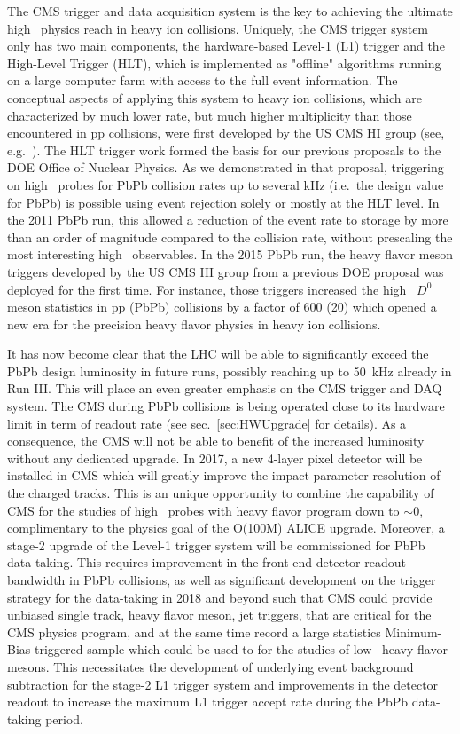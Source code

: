 The CMS trigger and data acquisition system is the key to achieving the ultimate high \pt\ physics reach in heavy ion collisions. Uniquely, the CMS trigger system only has two main components, the hardware-based Level-1 (L1) trigger and the High-Level Trigger (HLT), which is implemented as "offline" algorithms running on a large computer farm with access to the full event information.  
The conceptual aspects of applying this system to heavy ion collisions, which are characterized by much lower rate, but much higher multiplicity than those encountered in pp collisions, were first developed by the US CMS HI group (see, e.g.\ \cite{Roland:2007is}). The HLT trigger work formed the basis for our previous proposals to the DOE Office of Nuclear Physics. As we demonstrated in that proposal, triggering on high \pt\ probes for PbPb collision rates up to several kHz (i.e.\ the design value for PbPb) is possible using event rejection solely or mostly at the HLT level. In the 2011 PbPb run, this allowed a reduction of the event rate to storage by more than an order of magnitude compared to the collision rate, without prescaling the most interesting high \pt\ observables. In the 2015 PbPb run, the heavy flavor meson triggers developed by the US CMS HI group from a previous DOE proposal was deployed for the first time. For instance, those triggers increased the high \pt\ $D^0$ meson statistics in pp (PbPb) collisions by a factor of 600 (20) which opened a new era for the precision heavy flavor physics in heavy ion collisions.

It has now become clear that the LHC will be able to significantly exceed the PbPb design luminosity in future runs, possibly reaching up to 50~kHz already in Run III. This will place an even greater emphasis on the CMS trigger and DAQ system. The CMS during PbPb collisions is being operated close to its hardware limit in term of readout rate (see sec.~\ref{sec:HWUpgrade} for details). As a consequence, the CMS will not be able to benefit of the increased luminosity without any dedicated upgrade. 
In 2017, a new 4-layer pixel detector will be installed in CMS which will greatly improve the impact parameter resolution of the charged tracks. This is an unique opportunity to combine the capability of CMS for the studies of high \pt\ probes with heavy flavor program down to \pt$\sim 0$, complimentary to the physics goal of the O(100M) ALICE upgrade. Moreover, a stage-2 upgrade of the Level-1 trigger system will be commissioned for PbPb data-taking. This requires improvement in the front-end detector readout bandwidth in PbPb collisions, as well as significant development on the trigger strategy for the data-taking in 2018 and beyond such that CMS could provide unbiased single track, heavy flavor meson, jet triggers, that are critical for the CMS physics program, and at the same time record a large statistics Minimum-Bias triggered sample which could be used to for the studies of low \pt\ heavy flavor mesons. This necessitates the development of underlying event background subtraction for the stage-2 L1 trigger system and improvements in the detector readout to increase the maximum L1 trigger accept rate during the PbPb data-taking period.

